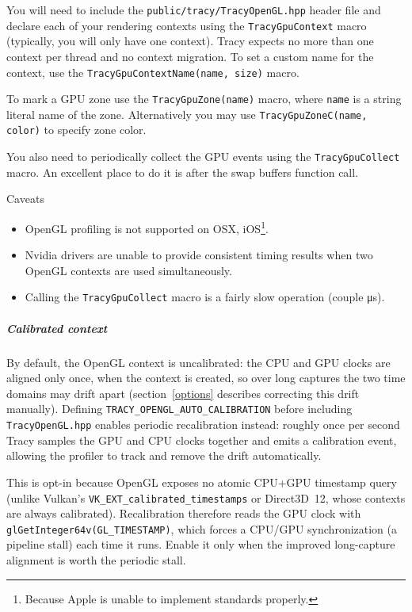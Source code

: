 \documentclass[hidelinks,titlepage,a4paper,twoside]{article}
\begin{document}
You will need to include the \texttt{public/tracy/TracyOpenGL.hpp} header file and declare each of your rendering contexts using the \texttt{TracyGpuContext} macro (typically, you will only have one context). Tracy expects no more than one context per thread and no context migration. To set a custom name for the context, use the \texttt{TracyGpuContextName(name, size)} macro.

To mark a GPU zone use the \texttt{TracyGpuZone(name)} macro, where \texttt{name} is a string literal name of the zone. Alternatively you may use \texttt{TracyGpuZoneC(name, color)} to specify zone color.

You also need to periodically collect the GPU events using the \texttt{TracyGpuCollect} macro. An excellent place to do it is after the swap buffers function call.

\begin{bclogo}[
noborder=true,
couleur=black!5,
logo=\bcattention
]{Caveats}
\begin{itemize}
\item OpenGL profiling is not supported on OSX, iOS\footnote{Because Apple is unable to implement standards properly.}.
\item Nvidia drivers are unable to provide consistent timing results when two OpenGL contexts are used simultaneously.
\item Calling the \texttt{TracyGpuCollect} macro is a fairly slow operation (couple \si{\micro\second}).
\end{itemize}
\end{bclogo}

\subparagraph{Calibrated context}

By default, the OpenGL context is uncalibrated: the CPU and GPU clocks are aligned only once, when the context is created, so over long captures the two time domains may drift apart (section~\ref{options} describes correcting this drift manually). Defining \texttt{TRACY\_OPENGL\_AUTO\_CALIBRATION} before including \texttt{TracyOpenGL.hpp} enables periodic recalibration instead: roughly once per second Tracy samples the GPU and CPU clocks together and emits a calibration event, allowing the profiler to track and remove the drift automatically.

This is opt-in because OpenGL exposes no atomic CPU+GPU timestamp query (unlike Vulkan's \texttt{VK\_EXT\_calibrated\_timestamps} or Direct3D~12, whose contexts are always calibrated). Recalibration therefore reads the GPU clock with \texttt{glGetInteger64v(GL\_TIMESTAMP)}, which forces a CPU/GPU synchronization (a pipeline stall) each time it runs. Enable it only when the improved long-capture alignment is worth the periodic stall.
\end{document}
